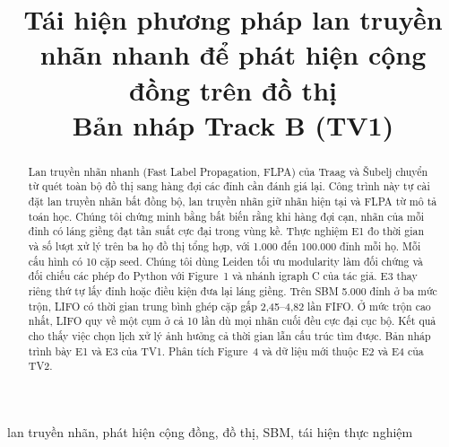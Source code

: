 \documentclass[conference]{IEEEtran}
\title{Tái hiện phương pháp lan truyền nhãn nhanh để phát hiện cộng đồng trên đồ thị\\
\large Bản nháp Track B (TV1)}
\author{\IEEEauthorblockN{Đồ án Khai thác dữ liệu}
\IEEEauthorblockA{Trường Đại học Khoa học Tự nhiên, ĐHQG-HCM}}
\begin{document}
\maketitle
\begin{abstract}
Lan truyền nhãn nhanh (Fast Label Propagation, FLPA) của Traag và Šubelj chuyển từ quét toàn bộ đồ thị sang hàng đợi các đỉnh cần đánh giá lại. Công trình này tự cài đặt lan truyền nhãn bất đồng bộ, lan truyền nhãn giữ nhãn hiện tại và FLPA từ mô tả toán học. Chúng tôi chứng minh bằng bất biến rằng khi hàng đợi cạn, nhãn của mỗi đỉnh có láng giềng đạt tần suất cực đại trong vùng kề. Thực nghiệm E1 đo thời gian và số lượt xử lý trên ba họ đồ thị tổng hợp, với 1.000 đến 100.000 đỉnh mỗi họ. Mỗi cấu hình có 10 cặp seed. Chúng tôi dùng Leiden tối ưu modularity làm đối chứng và đối chiếu các phép đo Python với Figure~1 và nhánh igraph C của tác giả. E3 thay riêng thứ tự lấy đỉnh hoặc điều kiện đưa lại láng giềng. Trên SBM 5.000 đỉnh ở ba mức trộn, LIFO có thời gian trung bình ghép cặp gấp 2,45–4,82 lần FIFO. Ở mức trộn cao nhất, LIFO quy về một cụm ở cả 10 lần dù mọi nhãn cuối đều cực đại cục bộ. Kết quả cho thấy việc chọn lịch xử lý ảnh hưởng cả thời gian lẫn cấu trúc tìm được. Bản nháp trình bày E1 và E3 của TV1. Phân tích Figure~4 và dữ liệu mới thuộc E2 và E4 của TV2.
\end{abstract}
\begin{IEEEkeywords}
lan truyền nhãn, phát hiện cộng đồng, đồ thị, SBM, tái hiện thực nghiệm
\end{IEEEkeywords}








\end{document}
